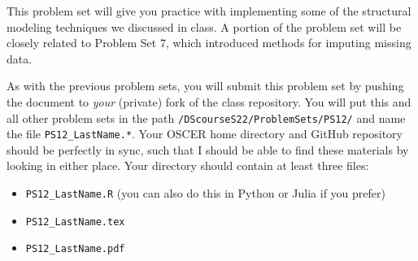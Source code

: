 \documentclass[12pt,english]{exam}
\begin{document}
This problem set will give you practice with implementing some of the structural modeling techniques we discussed in class. A portion of the problem set will be closely related to Problem Set 7, which introduced methods for imputing missing data.

As with the previous problem sets, you will submit this problem set by pushing the document to \emph{your} (private) fork of the class repository. You will put this and all other problem sets in the path \texttt{/DScourseS22/ProblemSets/PS12/} and name the file \texttt{PS12\_LastName.*}. Your OSCER home directory and GitHub repository should be perfectly in sync, such that I should be able to find these materials by looking in either place. Your directory should contain at least three files:
\begin{itemize}
    \item \texttt{PS12\_LastName.R} (you can also do this in Python or Julia if you prefer)
    \item \texttt{PS12\_LastName.tex}
    \item \texttt{PS12\_LastName.pdf}
\end{itemize}
\end{document}
